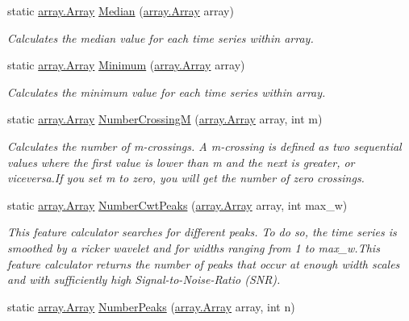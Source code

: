\begin{DoxyCompactItemize}
static \mbox{\hyperlink{classkhiva_1_1array_1_1_array}{array.\+Array}} \mbox{\hyperlink{classkhiva_1_1features_1_1_features_ade195f3e93cb66c5e84900d97aec1e68}{Median}} (\mbox{\hyperlink{classkhiva_1_1array_1_1_array}{array.\+Array}} array)
\begin{DoxyCompactList}\small\item\em Calculates the median value for each time series within array. \end{DoxyCompactList}\item 
static \mbox{\hyperlink{classkhiva_1_1array_1_1_array}{array.\+Array}} \mbox{\hyperlink{classkhiva_1_1features_1_1_features_a8214d2c861fef7bd0329349031c4d473}{Minimum}} (\mbox{\hyperlink{classkhiva_1_1array_1_1_array}{array.\+Array}} array)
\begin{DoxyCompactList}\small\item\em Calculates the minimum value for each time series within array. \end{DoxyCompactList}\item 
static \mbox{\hyperlink{classkhiva_1_1array_1_1_array}{array.\+Array}} \mbox{\hyperlink{classkhiva_1_1features_1_1_features_a9dc2fc89c2b9e1c5a397c6c47ae16171}{Number\+CrossingM}} (\mbox{\hyperlink{classkhiva_1_1array_1_1_array}{array.\+Array}} array, int m)
\begin{DoxyCompactList}\small\item\em Calculates the number of m-\/crossings. A m-\/crossing is defined as two sequential values where the first value is lower than m and the next is greater, or viceversa.\+If you set m to zero, you will get the number of zero crossings. \end{DoxyCompactList}\item 
static \mbox{\hyperlink{classkhiva_1_1array_1_1_array}{array.\+Array}} \mbox{\hyperlink{classkhiva_1_1features_1_1_features_a7fff71c6ba7f4ce4344e4395f506a35d}{Number\+Cwt\+Peaks}} (\mbox{\hyperlink{classkhiva_1_1array_1_1_array}{array.\+Array}} array, int max\+\_\+w)
\begin{DoxyCompactList}\small\item\em This feature calculator searches for different peaks. To do so, the time series is smoothed by a ricker wavelet and for widths ranging from 1 to max\+\_\+w.\+This feature calculator returns the number of peaks that occur at enough width scales and with sufficiently high Signal-\/to-\/\+Noise-\/\+Ratio (S\+NR). \end{DoxyCompactList}\item 
static \mbox{\hyperlink{classkhiva_1_1array_1_1_array}{array.\+Array}} \mbox{\hyperlink{classkhiva_1_1features_1_1_features_a4c4ac859a6d16dfafc5aa108b02b2c86}{Number\+Peaks}} (\mbox{\hyperlink{classkhiva_1_1array_1_1_array}{array.\+Array}} array, int n)

\end{DoxyCompactItemize}
